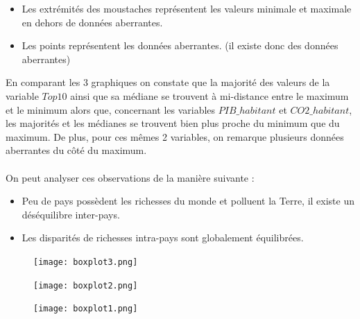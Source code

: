 \documentclass[a4paper, 11pt]{article}
\begin{document}
\begin{enumerate}[label=(\alph*)]
\begin{enumerate}[label=\roman*.]
\begin{itemize}[leftmargin=2cm]
        \item Les extrémités des moustaches représentent les valeurs minimale et maximale en dehors de données aberrantes.
        \item Les points représentent les données aberrantes. (il existe donc des données aberrantes)
        \end{itemize}
        En comparant les 3 graphiques on constate que la majorité des valeurs de la variable $Top10$ ainsi que sa médiane se trouvent à mi-distance entre le maximum et le minimum alors que, concernant les variables $PIB\_habitant$ et $CO2\_habitant$, les majorités et les médianes se trouvent bien plus proche du minimum que du maximum. De plus, pour ces mêmes 2 variables, on remarque plusieurs données aberrantes du côté du maximum.
        \\
        \\
        On peut analyser ces observations de la manière suivante : 
        \begin{itemize}[leftmargin=2cm]
        \item Peu de pays possèdent les richesses du monde et polluent la Terre, il existe un déséquilibre inter-pays.
        \item Les disparités de richesses intra-pays sont globalement équilibrées.
        \end{itemize}
        \begin{figure}[h!]
            \centering
            \texttt{[image: boxplot3.png]}
            \caption{}
            \label{fig:my_l}
            \end{figure}
            \begin{figure}[h]
            \begin{minipage}[b]{0.6\linewidth}
                \centering \texttt{[image: boxplot2.png]}
                \caption{}
            \end{minipage}\hfill
            \begin{minipage}[b]{0.4\linewidth}  
                \centering \texttt{[image: boxplot1.png]}
                \caption{}
            \end{minipage}
            \end{figure}
        

\end{enumerate}
\end{enumerate}
\end{document}
